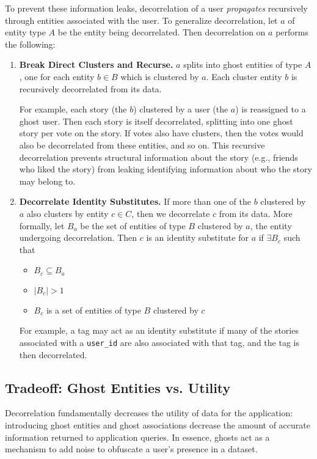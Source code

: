 To prevent these information leaks, decorrelation of a user \emph{propagates} recursively through
entities associated with the user. To generalize decorrelation, let $a$ of entity type $A$ be the
entity being decorrelated. Then decorrelation on $a$ performs the following: 
\begin{enumerate}
    \item \textbf{Break Direct Clusters and Recurse.} $a$ splits into ghost entities of type $A$, one for each entity
        $b\in B$ which is clustered by $a$. Each cluster entity $b$ is recursively
        decorrelated from its data.

        For example, each story (the $b$) clustered by a user (the $a$) is reassigned to a ghost
        user. Then each story is itself decorrelated, splitting into one ghost story per vote on the
        story. If votes also have clusters, then the votes would also be decorrelated from these
        entities, and so on. This recursive decorrelation prevents structural information about the
        story (e.g., friends who liked the story) from leaking identifying information about who the
        story may belong to.

    \item \textbf{Decorrelate Identity Substitutes.} If more than one of the $b$ clustered by $a$ also
        clusters by entity $c \in C$, then we decorrelate $c$ from its data. 
        More formally, let $B_a$ be the set of entities of type $B$ clustered by $a$, the entity undergoing
        decorrelation.  Then $c$ is an identity substitute for $a$ if $\exists B_c$ such that
        \begin{itemize}
            \item $B_c \subseteq B_a$
            \item $|B_c| > 1$ 
            \item $B_c$ is a set of entities of type $B$ clustered by $c$
        \end{itemize}

        For example, a tag may act as an identity substitute if many of the stories associated with
        a \texttt{user\_id} are also associated with that tag, and the tag is then decorrelated.
\end{enumerate}

\subsection{Tradeoff: Ghost Entities vs. Utility}
Decorrelation fundamentally decreases the utility of data for the application: introducing
ghost entities and ghost associations decrease the amount of accurate information returned to
application queries. In essence, ghosts act as a mechanism to add noise to obfuscate a user's
presence in a dataset.

